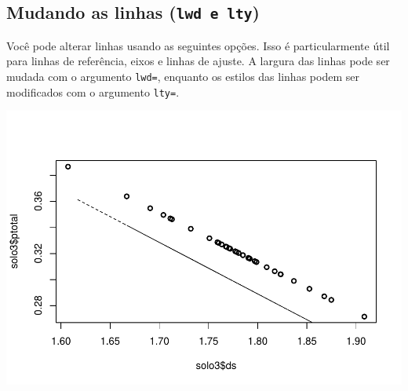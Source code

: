 \documentclass[]{book}
\newenvironment{Shaded}{\begin{snugshade}}{\end{snugshade}}
\newcommand{\CommentTok}[1]{\textcolor[rgb]{0.56,0.35,0.01}{\textit{#1}}}
\newcommand{\DataTypeTok}[1]{\textcolor[rgb]{0.13,0.29,0.53}{#1}}
\newcommand{\DecValTok}[1]{\textcolor[rgb]{0.00,0.00,0.81}{#1}}
\newcommand{\KeywordTok}[1]{\textcolor[rgb]{0.13,0.29,0.53}{\textbf{#1}}}
\newcommand{\NormalTok}[1]{#1}
\newcommand{\OperatorTok}[1]{\textcolor[rgb]{0.81,0.36,0.00}{\textbf{#1}}}
\begin{document}
\hypertarget{mudando-as-linhas-lwd-e-lty}{%
\subsection{\texorpdfstring{Mudando as linhas (\texttt{lwd\ e\ lty})}{Mudando as linhas (lwd e lty)}}\label{mudando-as-linhas-lwd-e-lty}}

Você pode alterar linhas usando as seguintes opções. Isso é particularmente útil para linhas de referência, eixos e linhas de ajuste. A largura das linhas pode ser mudada com o argumento \texttt{lwd=}, enquanto os estilos das linhas podem ser modificados com o argumento \texttt{lty=}.

\begin{Shaded}
\end{Shaded}

\includegraphics{TudodoR_files/figure-latex/unnamed-chunk-158-1.pdf}

\begin{Shaded}
\end{Shaded}
\end{document}
